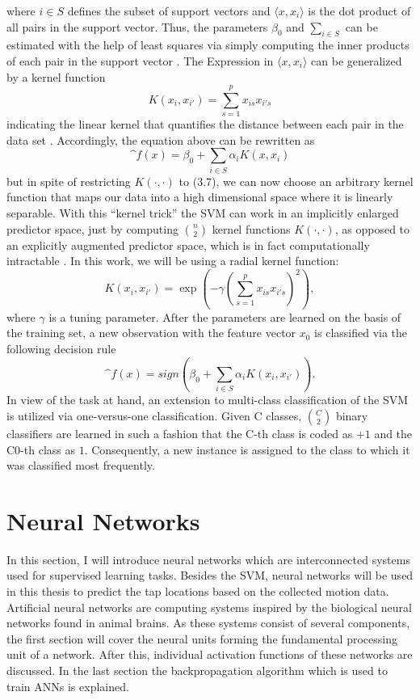 where $i \in S$ defines the subset of support vectors and $\langle x, x_i \rangle$ is the dot product of all pairs in the support vector. Thus, the parameters $\beta_0$ and $\sum_{i \in S}$ can be estimated with the help of least squares via simply computing the inner products of each pair in the support vector \cite{efron_hastie_2016}. The Expression in $\langle x, x_i \rangle$ can be generalized by a kernel function
\begin{equation}
  K(x_i,x_{i'}) = \sum_{s=1}^{p} x_{is} x_{i's}
\end{equation}
indicating the linear kernel that quantifies the distance between each pair in the data set \cite{James:2014:ISL:2517747}. Accordingly, the equation above can be rewritten as
\begin{equation}
  \^{f}(x) = \beta_0 + \sum_{i \in S} \alpha_i K(x, x_i)
\end{equation}
but in spite of restricting $K(\cdot, \cdot)$ to (3.7), we can now choose an arbitrary kernel function that maps our data into a high dimensional space where it is linearly separable. With this ``kernel trick'' the SVM can work in an implicitly enlarged predictor space, just by computing $\binom{n}{2}$  kernel functions $K(\cdot, \cdot)$, as opposed to an explicitly augmented predictor space, which is in fact computationally intractable \cite{James:2014:ISL:2517747}. In this work, we will be using a radial kernel function:
\begin{equation}
  K(x_i,x_{i'}) = \exp(-\gamma(\sum_{s=1}^{p}x_{is}x_{i's})^2),
\end{equation}
where $\gamma$ is a tuning parameter. After the parameters are learned on the basis of the training set, a new observation with the feature vector $x_0$ is classified via the following decision rule
\begin{equation}
  \^{f}(x) = sign(\beta_0 + \sum_{i \in S} \alpha_i K(x_i, x_{i'})).
\end{equation}
In view of the task at hand, an extension to multi-class classification of the SVM is utilized via one-versus-one classification. Given C classes, $\binom{C}{2}$ binary classifiers are learned in such a fashion that the C-th class is coded as $+1$ and the C0-th class as $1$. Consequently, a new instance is assigned to the class to which it was classified most frequently.
\newpage
\section{Neural Networks}
In this section, I will introduce neural networks which are interconnected systems used for supervised learning tasks. Besides the SVM, neural networks will be used in this thesis to predict the tap locations based on the collected motion data. Artificial neural networks are computing systems inspired by the biological neural networks found in animal brains. As these systems consist of several components, the first section will cover the neural units forming the fundamental processing unit of a network. After this, individual activation functions of these networks are discussed. In the last section the backpropagation algorithm which is used to train ANNs is explained.

